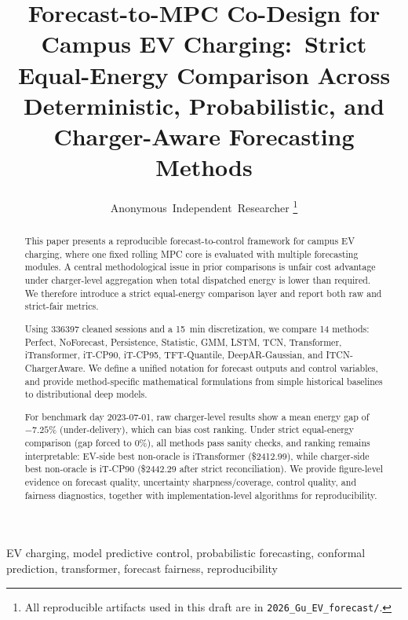 \documentclass[journal]{IEEEtran}
\title{Forecast-to-MPC Co-Design for Campus EV Charging:\
Strict Equal-Energy Comparison Across Deterministic, Probabilistic, and Charger-Aware Forecasting Methods}
\author{Anonymous~Independent~Researcher
\thanks{All reproducible artifacts used in this draft are in \texttt{2026\_Gu\_EV\_forecast/}.}}
\begin{document}
\maketitle

\begin{abstract}
This paper presents a reproducible forecast-to-control framework for campus EV charging, where one fixed rolling MPC core is evaluated with multiple forecasting modules. A central methodological issue in prior comparisons is unfair cost advantage under charger-level aggregation when total dispatched energy is lower than required. We therefore introduce a strict equal-energy comparison layer and report both raw and strict-fair metrics.

Using \num{336397} cleaned sessions and a \SI{15}{min} discretization, we compare 14 methods: Perfect, NoForecast, Persistence, Statistic, GMM, LSTM, TCN, Transformer, iTransformer, iT-CP90, iT-CP95, TFT-Quantile, DeepAR-Gaussian, and ITCN-ChargerAware. We define a unified notation for forecast outputs and control variables, and provide method-specific mathematical formulations from simple historical baselines to distributional deep models.

For benchmark day 2023-07-01, raw charger-level results show a mean energy gap of $-7.25\%$ (under-delivery), which can bias cost ranking. Under strict equal-energy comparison (gap forced to $0\%$), all methods pass sanity checks, and ranking remains interpretable: EV-side best non-oracle is iTransformer (\$2412.99), while charger-side best non-oracle is iT-CP90 (\$2442.29 after strict reconciliation). We provide figure-level evidence on forecast quality, uncertainty sharpness/coverage, control quality, and fairness diagnostics, together with implementation-level algorithms for reproducibility.
\end{abstract}

\begin{IEEEkeywords}
EV charging, model predictive control, probabilistic forecasting, conformal prediction, transformer, forecast fairness, reproducibility
\end{IEEEkeywords}
\end{document}
